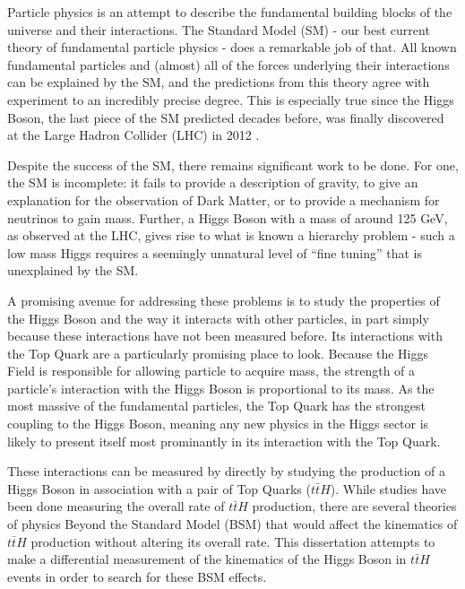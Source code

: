 Particle physics is an attempt to describe the fundamental building blocks of the universe and their interactions. The Standard Model (SM) - our best current theory of fundamental particle physics - does a remarkable job of that. All known fundamental particles and (almost) all of the forces underlying their interactions can be explained by the SM, and the predictions from this theory agree with experiment to an incredibly precise degree. This is especially true since the Higgs Boson, the last piece of the SM predicted decades before, was finally discovered at the Large Hadron Collider (LHC) in 2012 \cite{HIGG-2012-27}. 

Despite the success of the SM, there remains significant work to be done. For one, the SM is incomplete: it fails to provide a description of gravity, to give an explanation for the observation of Dark Matter, or to provide a mechanism for neutrinos to gain mass. Further, a Higgs Boson with a mass of around 125 GeV, as observed at the LHC, gives rise to what is known a hierarchy problem - such a low mass Higgs requires a seemingly unnatural level of ``fine tuning'' that is unexplained by the SM.

A promising avenue for addressing these problems is to study the properties of the Higgs Boson and the way it interacts with other particles, in part simply because these interactions have not been measured before. Its interactions with the Top Quark are a particularly promising place to look. Because the Higgs Field is responsible for allowing particle to acquire mass, the strength of a particle's interaction with the Higgs Boson is proportional to its mass. As the most massive of the fundamental particles, the Top Quark has the strongest coupling to the Higgs Boson, meaning any new physics in the Higgs sector is likely to present itself most prominantly in its interaction with the Top Quark.

These interactions can be measured by directly by studying the production of a Higgs Boson in association with a pair of Top Quarks ($t\bar{t}H$). While studies have been done measuring the overall rate of $t\bar{t}H$ production, there are several theories of physics Beyond the Standard Model (BSM) that would affect the kinematics of $t\bar{t}H$ production without altering its overall rate. This dissertation attempts to make a differential measurement of the kinematics of the Higgs Boson in $t\bar{t}H$ events in order to search for these BSM effects.


